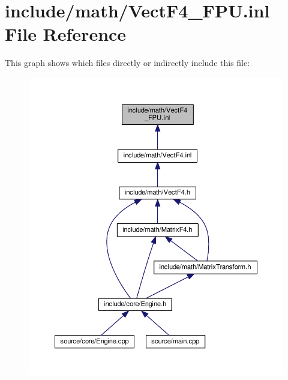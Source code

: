 \hypertarget{VectF4__FPU_8inl}{\section{include/math/\-Vect\-F4\-\_\-\-F\-P\-U.inl File Reference}
\label{VectF4__FPU_8inl}
}
This graph shows which files directly or indirectly include this file\-:
\nopagebreak
\begin{figure}[H]
\begin{center}
\leavevmode
\includegraphics[width=350pt]{VectF4__FPU_8inl__dep__incl}
\end{center}
\end{figure}
